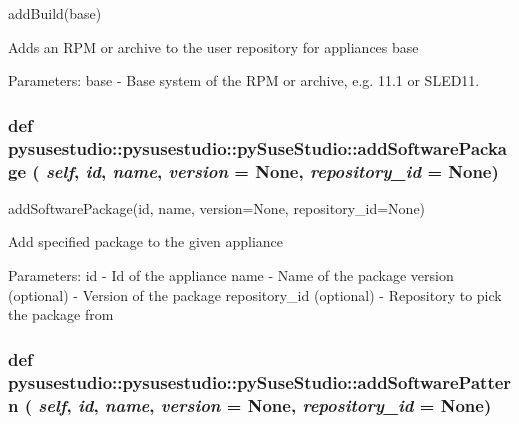 \label{classpysusestudio_1_1pysusestudio_1_1py_suse_studio_a6b47e03a278d2d51e82eeecb6420f2e1}
\begin{DoxyVerb}addBuild(base)

            Adds an RPM or archive to the user repository for appliances base 
            
            Parameters:
base - Base system of the RPM or archive, e.g. 11.1 or SLED11.


\end{DoxyVerb}
 \hypertarget{classpysusestudio_1_1pysusestudio_1_1py_suse_studio_a8f0bac2780c2f724ca496d6aef3ab66d}{
\subsubsection[{addSoftwarePackage}]{\setlength{\rightskip}{0pt plus 5cm}def pysusestudio::pysusestudio::pySuseStudio::addSoftwarePackage ( {\em self}, \/   {\em id}, \/   {\em name}, \/   {\em version} = {\ttfamily None}, \/   {\em repository\_\-id} = {\ttfamily None})}}
\label{classpysusestudio_1_1pysusestudio_1_1py_suse_studio_a8f0bac2780c2f724ca496d6aef3ab66d}
\begin{DoxyVerb}addSoftwarePackage(id, name, version=None, repository_id=None)

            Add specified package to the given appliance
            
            Parameters:
id - Id of the appliance
name - Name of the package
version (optional) - Version of the package
repository_id (optional) - Repository to pick the package from

\end{DoxyVerb}
 \hypertarget{classpysusestudio_1_1pysusestudio_1_1py_suse_studio_a4841d8303b24923a3be7de04e07c82c7}{
\subsubsection[{addSoftwarePattern}]{\setlength{\rightskip}{0pt plus 5cm}def pysusestudio::pysusestudio::pySuseStudio::addSoftwarePattern ( {\em self}, \/   {\em id}, \/   {\em name}, \/   {\em version} = {\ttfamily None}, \/   {\em repository\_\-id} = {\ttfamily None})}}
